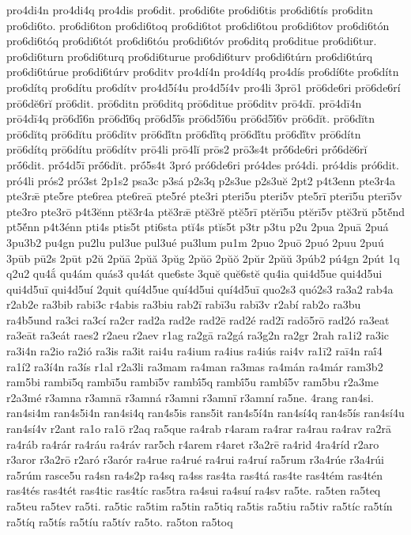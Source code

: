 {pro4di4n
pro4di4q
pro4dis
pro6dit.
pro6di6te
pro6di6tis
pro6di6tís
pro6ditn
pro6di6to.
pro6di6ton
pro6di6toq
pro6di6tot
pro6di6tou
pro6di6tov
pro6di6tón
pro6di6tóq
pro6di6tót
pro6di6tóu
pro6di6tóv
pro6ditq
pro6ditue
pro6di6tur.
pro6di6turn
pro6di6turq
pro6di6turue
pro6di6turv
pro6di6túrn
pro6di6túrq
pro6di6túrue
pro6di6túrv
pro6ditv
pro4dí4n
pro4dí4q
pro4dís
pro6dí6te
pro6dítn
pro6dítq
pro6dítu
pro6dítv
pro4d5í4u
pro4d5í4v
pro4li
3prō1
prō6de6ri
prō6de6rí
prō6dĕ6rĭ
prō6dit.
prō6ditn
prō6ditq
prō6ditue
prō6ditv
prō4dī.
prō4dī4n
prō4dī4q
prō6dī́6n
prō6dī́6q
prō6d5ī́s
prō6d5ī́6u
prō6d5ī́6v
prō6dĭt.
prō6dĭtn
prō6dĭtq
prō6dĭtu
prō6dĭtv
prō6dĭ́tn
prō6dĭ́tq
prō6dĭ́tu
prō6dĭ́tv
prō6dítn
prō6dítq
prō6dítu
prō6dítv
prō4li
prō4lĭ
prōs2
prō3s4t
prṓ6de6ri
prṓ6dĕ6rĭ
prṓ6dit.
prṓ4d5ī
prṓ6dĭt.
prṓ5s4t
3pró
pró6de6ri
pró4des
pró4di.
pró4dis
pró6dit.
pró4li
prós2
pró3st
2p1s2
psa3c
p3sá
p2s3q
p2s3ue
p2s3uĕ
2pt2
p4t3enn
pte3r4a
pte3rǣ
pte5re
pte6rea
pte6reā
pte5ré
pte3ri
pteri5u
pteri5v
pte5rī
pterī5u
pterī5v
pte3ro
pte3rō
p4t3ĕnn
ptĕ3r4a
ptĕ3rǣ
ptĕ3rĕ
ptĕ5rī
ptĕrī5u
ptĕrī5v
ptĕ3rŭ
p5tĕ́nd
pt5ĕ́nn
p4t3énn
pti4s
ptis5t
pti6sta
ptĭ4s
ptĭs5t
p3tr
p3tu
p2u
2pua
2puā
2puá
3pu3b2
pu4gn
pu2lu
pul3ue
pul3ué
pu3lum
pu1m
2puo
2puō
2puó
2puu
2puú
3pūb
pū2s
2pūt
p2ŭ
2pŭā
2pŭă
3pŭg
2pŭō
2pŭŏ
2pŭr
2pŭŭ
3púb2
pú4gn
2pút
1q
q2u2
qu4ắ
qu4ám
quás3
qu4át
que6ste
3quĕ
quĕ6stĕ
qu4ia
qui4d5ue
qui4d5ui
qui4d5uī
qui4d5uí
2quit
quí4d5ue
quí4d5ui
quí4d5uī
quo2s3
quó2s3
ra3a2
rab4a
r2ab2e
ra3bib
rabi3c
r4abis
ra3biu
rab2ī
rabī3u
rabī3v
r2abí
rab2o
ra3bu
ra4b5und
ra3ci
ra3cí
ra2cr
rad2a
rad2e
rad2ē
rad2é
rad2ī
radō5rō
rad2ó
ra3eat
ra3eāt
ra3eát
raes2
r2aeu
r2aev
r1ag
ra2gā
ra2gá
ra3g2n
ra2gr
2rah
ra1i2
ra3ic
ra3i4n
ra2io
ra2ió
ra3is
ra3it
rai4u
ra4ium
ra4ius
ra4iús
rai4v
ra1ī2
raī4n
raī́4
ra1í2
ra3í4n
ra3ís
r1al
r2a3li
ra3mam
ra4man
ra3mas
ra4mán
ra4már
ram3b2
ram5bi
rambī5q
rambī5u
rambī5v
rambī́5q
rambī́5u
rambī́5v
ram5bu
r2a3me
r2a3mé
r3amna
r3amnā
r3amná
r3amni
r3amnī
r3amní
ra5ne.
4rang
ran4si.
ran4si4m
ran4s5i4n
ran4si4q
ran4s5is
rans5it
ran4s5í4n
ran4sí4q
ran4s5ís
ran4sí4u
ran4sí4v
r2ant
ra1o
ra1ō
r2aq
ra5que
ra4rab
r4aram
ra4rar
ra4rau
ra4rav
ra2rā
ra4ráb
ra4rár
ra4ráu
ra4ráv
rar5ch
r4arem
r4aret
r3a2rē
ra4rid
4ra4ríd
r2aro
r3aror
r3a2rō
r2aró
r3arór
ra4rue
ra4rué
ra4rui
ra4ruí
ra5rum
r3a4rúe
r3a4rúi
ra5rúm
rasce5u
ra4sn
ra4s2p
ra4sq
ra4ss
ras4ta
ras4tá
ras4te
ras4tém
ras4tén
ras4tés
ras4tét
ras4tic
ras4tíc
ras5tra
ra4sui
ra4suí
ra4sv
ra5te.
ra5ten
ra5teq
ra5teu
ra5tev
ra5ti.
ra5tic
ra5tim
ra5tin
ra5tiq
ra5tis
ra5tiu
ra5tiv
ra5tíc
ra5tín
ra5tíq
ra5tís
ra5tíu
ra5tív
ra5to.
ra5ton
ra5toq
}

